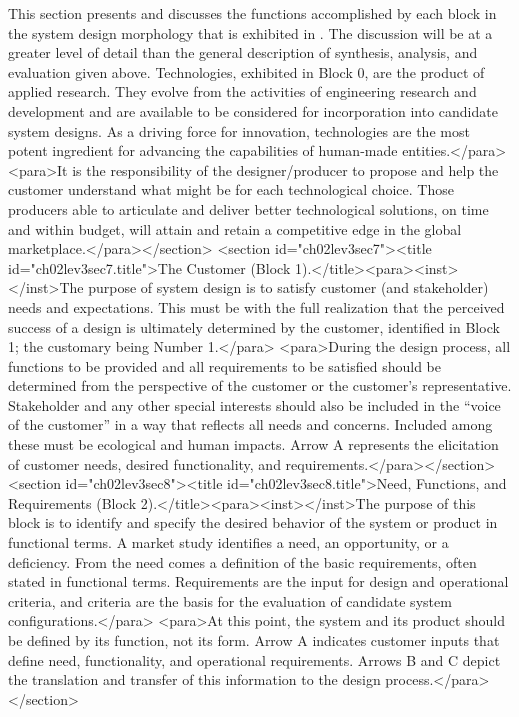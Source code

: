 This section presents and discusses the functions accomplished by each block in the system design morphology that is exhibited in . The discussion will be at a greater level of detail than the general description of synthesis, analysis, and evaluation given above.
Technologies, exhibited in Block 0, are the product of applied research. They evolve from the activities of engineering research and development and are available to be considered for incorporation into candidate system designs. As a driving force for innovation, technologies are the most potent ingredient for advancing the capabilities of human-made entities.</para>
<para>It is the responsibility of the designer/producer to propose and help the customer understand what might be for each technological choice. Those producers able to articulate and deliver better technological solutions, on time and within budget, will attain and retain a competitive edge in the global marketplace.</para></section>
<section id="ch02lev3sec7"><title id="ch02lev3sec7.title">The Customer (Block 1).</title><para><inst></inst>The purpose of system design is to satisfy customer (and stakeholder) needs and expectations. This must be with the full realization that the perceived success of a design is ultimately determined by the customer, identified in Block 1; the customary being Number 1.</para>
<para>During the design process, all functions to be provided and all requirements to be satisfied should be determined from the perspective of the customer or the customer’s representative. Stakeholder and any other special interests should also be included in the “voice of the customer” in a way that reflects all needs and concerns. Included among these must be ecological and human impacts. Arrow A represents the elicitation of customer needs, desired functionality, and requirements.</para></section>
<section id="ch02lev3sec8"><title id="ch02lev3sec8.title">Need, Functions, and Requirements (Block 2).</title><para><inst></inst>The purpose of this block is to identify and specify the desired behavior of the system or product in functional terms. A market study identifies a need, an opportunity, or a deficiency. From the need comes a definition of the basic requirements, often stated in functional terms. Requirements are the input for design and operational criteria, and criteria are the basis for the evaluation of candidate system configurations.</para>
<para>At this point, the system and its product should be defined by its function, not its form. Arrow A indicates customer inputs that define need, functionality, and operational requirements. Arrows B and C depict the translation and transfer of this information to the design process.</para></section>
